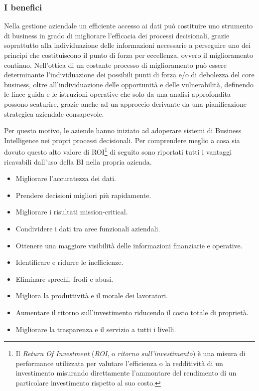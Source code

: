 \subsubsection{I benefici}

Nella gestione aziendale un efficiente accesso ai dati può costituire uno strumento di business in grado di migliorare l'efficacia dei processi decisionali, grazie soprattutto alla individuazione delle informazioni necessarie a perseguire uno dei principi che costituiscono il punto di forza per eccellenza, ovvero il miglioramento continuo. Nell'ottica di un costante processo di miglioramento può essere determinante l'individuazione dei possibili punti di forza e/o di debolezza del core business, oltre all'individuazione delle opportunità e delle vulnerabilità, definendo le linee guida e le istruzioni operative che solo da una analisi approfondita possono scaturire, grazie anche ad un approccio derivante da una pianificazione strategica aziendale consapevole.\cite{dalla_bi_al_dw}

Per questo motivo, le aziende hanno iniziato ad adoperare sistemi di Business Intelligence nei propri processi decisionali. Per comprendere meglio a cosa sia dovuto questo alto valore di ROI\footnote{Il \textit{Return Of Investment} (\textit{ROI}, o \textit{ritorno sull'investimento}) è una misura di performance utilizzata per valutare l'efficienza o la redditività di un investimento misurando direttamente l'ammontare del rendimento di un particolare investimento rispetto al suo costo.\cite{investopedia_roi}} di seguito sono riportati tutti i vantaggi ricavabili dall'uso della BI nella propria azienda.\cite{oracle_business_intelligence}

\begin{itemize}
    \item Migliorare l'accuratezza dei dati.
    \item Prendere decisioni migliori più rapidamente.
    \item Migliorare i risultati mission-critical.
    \item Condividere i dati tra aree funzionali aziendali.
    \item Ottenere una maggiore visibilità delle informazioni finanziarie e operative.
    \item Identificare e ridurre le inefficienze.
    \item Eliminare sprechi, frodi e abusi.
    \item Migliora la produttività e il morale dei lavoratori.
    \item Aumentare il ritorno sull'investimento riducendo il costo totale di proprietà.
    \item Migliorare la trasparenza e il servizio a tutti i livelli.
\end{itemize}

